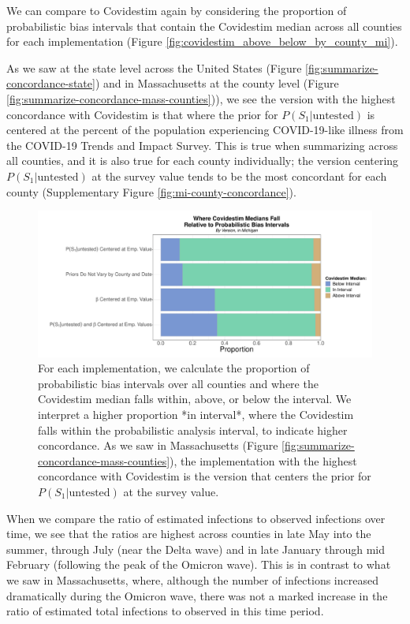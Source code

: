 \documentclass[12pt,twoside]{smiththesis}
\begin{document}
We can compare to Covidestim again by considering the proportion of probabilistic bias intervals that contain the Covidestim median across all counties for each implementation (Figure \ref{fig:covidestim_above_below_by_county_mi}).

As we saw at the state level across the United States (Figure \ref{fig:summarize-concordance-state}) and in
Massachusetts at the county level (Figure \ref{fig:summarize-concordance-mass-counties})), we see the version with the highest concordance with Covidestim is that where the prior for \(P(S_1|\text{untested})\) is centered at the percent of the population experiencing COVID-19-like illness from the COVID-19 Trends and Impact Survey. This is true when summarizing across all counties, and it is also true for each county individually; the version centering \(P(S_1|\text{untested})\) at the survey value tends to be the most concordant for each county (Supplementary Figure \ref{fig:mi-county-concordance}).
\begin{figure}
\includegraphics[width=1\linewidth]{figure/summarize-concordance-mich-counties} \caption{\label{fig:covidestim_above_below_by_county_mi} For each implementation, we calculate the proportion of probabilistic bias intervals over all counties and where the Covidestim median falls within, above, or below the interval. We interpret a higher proportion *in interval*, where the Covidestim falls within the probabilistic analysis interval, to indicate higher concordance. As we saw in Massachusetts (Figure \ref{fig:summarize-concordance-mass-counties}), the implementation with the highest concordance with Covidestim is the version that centers the prior for $P(S_1|\text{untested})$ at the survey value.}\label{fig:unnamed-chunk-96}
\end{figure}
When we compare the ratio of estimated infections to observed infections over time, we see that the ratios are highest across counties in late May into the summer, through July (near the Delta wave) and in late January through mid February (following the peak of the Omicron wave). This is in contrast to what we saw in Massachusetts, where, although the number of infections increased dramatically during the Omicron wave, there was not a marked increase in the ratio of estimated total infections to observed in this time period.
\end{document}
